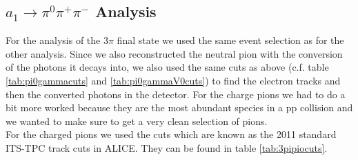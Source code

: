 \subsection{$a_1 \rightarrow \pi^0\pi^{+}\pi^{-}$ Analysis}
For the analysis of the 3$\pi$ final state we used the same event selection as for the other analysis. Since we also reconstructed the neutral pion with the conversion of the photons it decays into, we also used the same cuts as above (c.f. table \ref{tab:pi0gammacuts} and \ref{tab:pi0gammaV0cuts}) to find the electron tracks and then the converted photons in the detector. For the charge pions we had to do a bit more worked because they are the most abundant species in a pp collision and we wanted to make sure to get a very clean selection of pions. \\
For the charged pions we used the cuts which are known as the 2011 standard ITS-TPC track cuts in ALICE. They can be found in table \ref{tab:3pipiocuts}. \\
